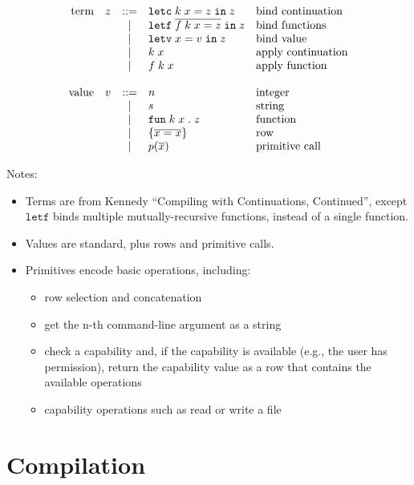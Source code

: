\documentclass[11pt]{article}
\newcommand{\kw}[1]{\mathtt{#1}}
\begin{document}
\[
\begin{array}{rlcll}
\text{term}
  & z & ::= & \letc{k}{x}{z}{z}              & \text{bind continuation} \\
  &   & |   & \letf{\defterm{f}{k}{x}{z}}{z} & \text{bind functions} \\
  &   & |   & \letv{x}{v}{z}                 & \text{bind value} \\
  &   & |   & \appc{k}{x}                    & \text{apply continuation} \\
  &   & |   & \appf{f}{k}{x}                 & \text{apply function} \\
\\
\text{value}
  & v & ::= & \intv{n}           & \text{integer}  \\
  &   & |   & \strv{s}           & \text{string} \\
  &   & |   & \funv{k}{x}{z}     & \text{function} \\
  &   & |   & \rowv{x}{x}        & \text{row} \\
  &   & |   & \prmv{p}{\repo{x}}  & \text{primitive call} \\
\end{array}
\]

Notes:
\begin{itemize}
\item Terms are from Kennedy ``Compiling with Continuations, Continued'', except $\kw{letf}$ binds multiple mutually-recursive functions, instead of a single function.
\item Values are standard, plus rows and primitive calls.
\item Primitives encode basic operations, including:
\begin{itemize}
\item row selection and concatenation
\item get the n-th command-line argument as a string
\item check a capability and, if the capability is available (e.g., the user has permission), return the capability value as a row that contains the available operations
\item capability operations such as read or write a file
\end{itemize}
\end{itemize}

\newpage

\section{Compilation}
\end{document}
